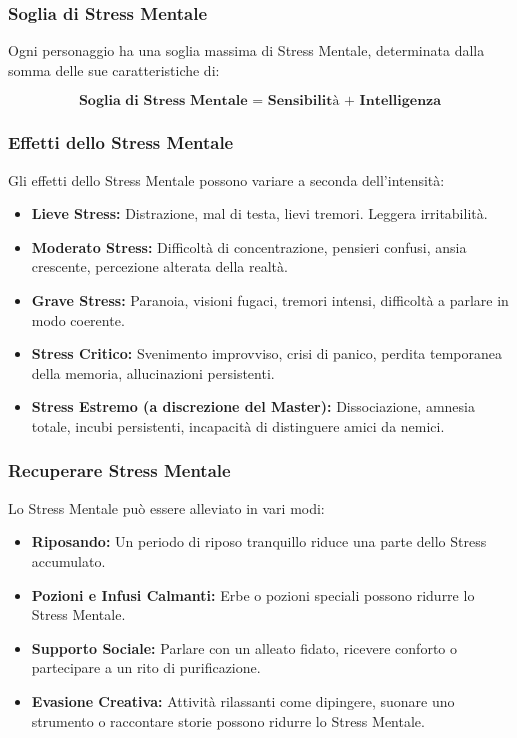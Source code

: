 \documentclass[../manuale_main.tex]{subfiles}
\begin{document}
\subsubsection{Soglia di Stress Mentale}
Ogni personaggio ha una soglia massima di Stress Mentale, determinata dalla somma delle sue caratteristiche di:

\[
\textbf{Soglia di Stress Mentale = Sensibilità + Intelligenza}
\]

\subsubsection{Effetti dello Stress Mentale}
Gli effetti dello Stress Mentale possono variare a seconda dell'intensità:

\begin{itemize}
\item \textbf{Lieve Stress:} Distrazione, mal di testa, lievi tremori. Leggera irritabilità.
\item \textbf{Moderato Stress:} Difficoltà di concentrazione, pensieri confusi, ansia crescente, percezione alterata della realtà.
\item \textbf{Grave Stress:} Paranoia, visioni fugaci, tremori intensi, difficoltà a parlare in modo coerente.
\item \textbf{Stress Critico:} Svenimento improvviso, crisi di panico, perdita temporanea della memoria, allucinazioni persistenti.
\item \textbf{Stress Estremo (a discrezione del Master):} Dissociazione, amnesia totale, incubi persistenti, incapacità di distinguere amici da nemici.
\end{itemize}

\subsubsection{Recuperare Stress Mentale}
Lo Stress Mentale può essere alleviato in vari modi:
\begin{itemize}
    \item \textbf{Riposando:} Un periodo di riposo tranquillo riduce una parte dello Stress accumulato.
    \item \textbf{Pozioni e Infusi Calmanti:} Erbe o pozioni speciali possono ridurre lo Stress Mentale.
    \item \textbf{Supporto Sociale:} Parlare con un alleato fidato, ricevere conforto o partecipare a un rito di purificazione.
    \item \textbf{Evasione Creativa:} Attività rilassanti come dipingere, suonare uno strumento o raccontare storie possono ridurre lo Stress Mentale.
\end{itemize}
\end{document}
